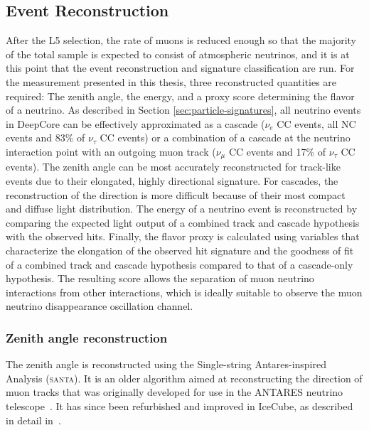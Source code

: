 \subsection{Event Reconstruction}
\label{sec:event-reconstruction}

After the L5 selection, the rate of muons is reduced enough so that the majority of the total sample is expected to consist of atmospheric neutrinos, and it is at this point that the event reconstruction and signature classification are run. For the measurement presented in this thesis, three reconstructed quantities are required: The zenith angle, the energy, and a proxy score determining the flavor of a neutrino. As described in Section \ref{sec:particle-signatures}, all neutrino events in DeepCore can be effectively approximated as a cascade ($\nu_e$ CC events, all NC events and 83\% of $\nu_\tau$ CC events) or a combination of a cascade at the neutrino interaction point with an outgoing muon track ($\nu_\mu$ CC events and 17\% of $\nu_\tau$ CC events). The zenith angle can be most accurately reconstructed for track-like events due to their elongated, highly directional signature. For cascades, the reconstruction of the direction is more difficult because of their most compact and diffuse light distribution. The energy of a neutrino event is reconstructed by comparing the expected light output of a combined track and cascade hypothesis with the observed hits. Finally, the flavor proxy is calculated using variables that characterize the elongation of the observed hit signature and the goodness of fit of a combined track and cascade hypothesis compared to that of a cascade-only hypothesis. The resulting score allows the separation of muon neutrino interactions from other interactions, which is ideally suitable to observe the muon neutrino disappearance oscillation channel.

\subsubsection{Zenith angle reconstruction}
\label{sec:santa}
The zenith angle is reconstructed using the Single-string Antares-inspired Analysis (\textsc{santa}). It is an older algorithm aimed at reconstructing the direction of muon tracks that was originally developed for use in the ANTARES neutrino telescope~. It has since been refurbished and improved in IceCube, as described in detail in~.

